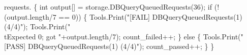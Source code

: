 \documentclass{article}
\def\nwendcode{\endtrivlist \endgroup}
\let\nwdocspar=\par
\begin{document}
requests.
\nwenddocs{}\endmoddef{}
\{
  int output[] = storage.DBQueryQueuedRequests(36);
  if (!(output.length/7 == 0)) \{
    Tools.Print("[FAIL] DBQueryQueuedRequests(1) (4/4)");
    Tools.Print("\\tExpected 0; got "+output.length/7);
    count_failed++;
  \} else \{
    Tools.Print("[PASS] DBQueryQueuedRequests(1) (4/4)");
    count_passed++;
  \}
\}
\nwendcode{}\nwdocspar
\end{document}
